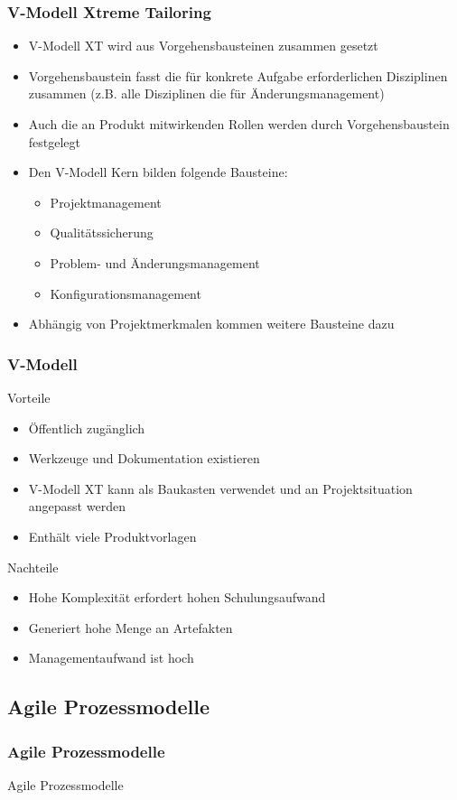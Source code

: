 \begin{frame}
\frametitle{V-Modell Xtreme Tailoring}
	\begin{itemize}
		\item V-Modell XT wird aus Vorgehensbausteinen zusammen gesetzt
		\item Vorgehensbaustein fasst die für konkrete Aufgabe erforderlichen
					Disziplinen zusammen (z.B. alle Disziplinen die für Änderungsmanagement)
		\item Auch die an Produkt mitwirkenden Rollen werden durch Vorgehensbaustein
					festgelegt
		\item Den V-Modell Kern bilden folgende Bausteine:
					\begin{itemize}
						\item Projektmanagement
						\item Qualitätssicherung
						\item Problem- und Änderungsmanagement
						\item Konfigurationsmanagement
					\end{itemize}
	 \item Abhängig von Projektmerkmalen kommen weitere Bausteine dazu
	\end{itemize}
\end{frame}

\begin{frame}
\frametitle{V-Modell}
	Vorteile
	\begin{itemize}
		\item Öffentlich zugänglich
		\item Werkzeuge und Dokumentation existieren
		\item V-Modell XT kann als Baukasten verwendet und an Projektsituation angepasst werden
		\item Enthält viele Produktvorlagen
	\end{itemize}
	\bigskip
	Nachteile
	\begin{itemize}
		\item Hohe Komplexität erfordert hohen Schulungsaufwand
		\item Generiert hohe Menge an Artefakten
		\item Managementaufwand ist hoch
	\end{itemize}
\end{frame}

\subsection{Agile Prozessmodelle}
\begin{frame}
\frametitle{Agile Prozessmodelle}
\huge Agile Prozessmodelle
\end{frame}


